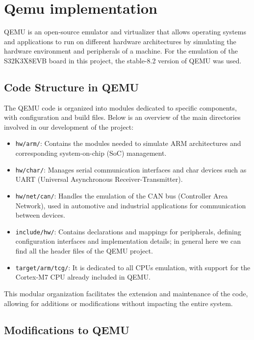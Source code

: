 \section{Qemu implementation}
QEMU \cite{qemu_documentation} is an open-source emulator and virtualizer that allows operating systems and applications to run on different hardware architectures by simulating the hardware environment and peripherals of a machine. For the emulation of the S32K3X8EVB board in this project, the stable-8.2 version of QEMU was used.


\subsection{Code Structure in QEMU}
The QEMU code is organized into modules dedicated to specific components, with configuration and build files. Below is an overview of the main directories involved in our development of the project:

\begin{itemize}
    \item \texttt{hw/arm/}: Contains the modules needed to simulate ARM architectures and corresponding system-on-chip (SoC) management.
    \item \texttt{hw/char/}: Manages serial communication interfaces and char devices such as UART (Universal Asynchronous Receiver-Transmitter).
    \item \texttt{hw/net/can/}: Handles the emulation of the CAN bus (Controller Area Network), used in automotive and industrial applications for communication between devices.
    \item \texttt{include/hw/}: Contains declarations and mappings for peripherals, defining configuration interfaces and implementation details; in general here we can find all the header files of the QEMU project.
    \item \texttt{target/arm/tcg/}: It is dedicated to all CPUs emulation, with support for the Cortex-M7 CPU already included in QEMU.
\end{itemize}

This modular organization facilitates the extension and maintenance of the code, allowing for additions or modifications without impacting the entire system.


\subsection{Modifications to QEMU}


